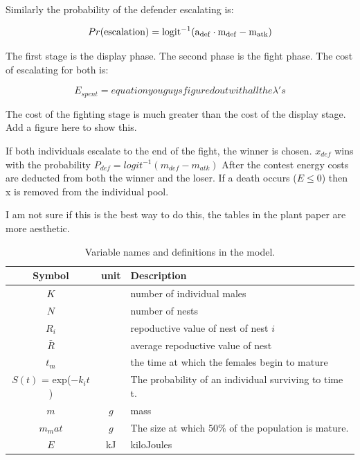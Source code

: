 \documentclass[a4paper,11pt]{article}
\begin{document}
Similarly the probability of the defender escalating is:

\begin{equation}\label{eq:defender_escalating}
          Pr(\rm{escalation}) =  logit^{-1}(a_{def} \cdot m_{def} - m_{atk})
\end{equation}

The first stage is the display phase.  The second phase is the fight phase.  The cost of escalating for both is:

\begin{equation}\label{eq:defender_escalating}
E_{spent}=equation you guys figured out with all the \lambda 's
\end{equation}

The cost of the fighting stage is much greater than the cost of the display stage. Add a figure here to show this.  

If both individuals escalate to the end of the fight, the winner is chosen.  $x_{def}$ wins with the probability $P_{def} = logit^{-1}(m_{def} - m_{atk})$
After the contest energy costs are deducted from both the winner and the loser.
If a death occurs ($E \leq 0$) then x is removed from the individual pool.


\clearpage

I am not sure if this is the best way to do this, the tables in the plant paper are more aesthetic.\\

\begin{table}[h!]
    \caption{Variable names and definitions in the model.}
    \centering
    \begin{tabular}{c | c | l }
        \hline
        Symbol & unit & Description\\
        \hline
        \hline
        $K$ & & number of individual males \\
        $N$ & & number of nests \\
        $R_i$ & & repoductive value of nest of nest $i$\\
        $\bar{R}$ & & average repoductive value of nest\\
        \hline
        $t_m$ & & the time at which the females begin to mature\\
        $S(t)$ = exp($-k_it$) & & The probability of an individual surviving to time t.\\
        \hline
        $m$ & $g$ & mass\\
        $m_mat$ & $g$ & The size at which 50\% of the population is mature.\\
        $E$ & kJ & kiloJoules\\
        \hline
    \end{tabular}
\end{table}
\end{document}
